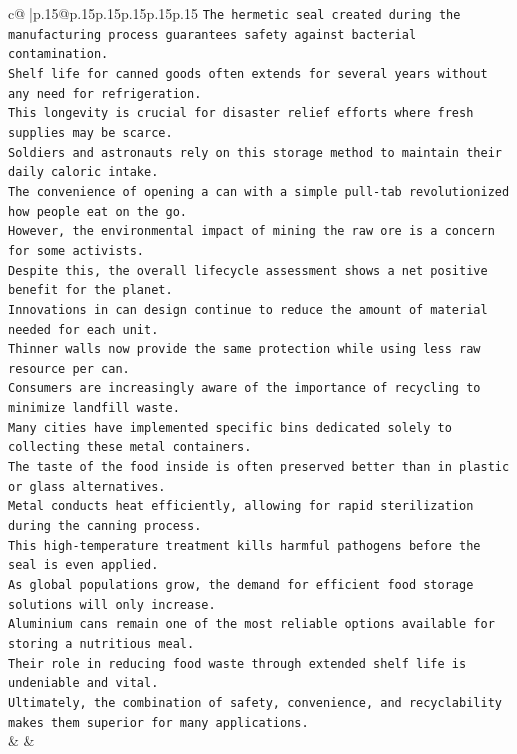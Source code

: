 \documentclass{article}
\begin{document}
{\begin{supertabular}{c@{$\;$}|p{.15\linewidth}@{}p{.15\linewidth}p{.15\linewidth}p{.15\linewidth}p{.15\linewidth}p{.15\linewidth}}
{{{\texttt{The hermetic seal created during the manufacturing process guarantees safety against bacterial contamination.} \\
\texttt{Shelf life for canned goods often extends for several years without any need for refrigeration.} \\
\texttt{This longevity is crucial for disaster relief efforts where fresh supplies may be scarce.} \\
\texttt{Soldiers and astronauts rely on this storage method to maintain their daily caloric intake.} \\
\texttt{The convenience of opening a can with a simple pull{-}tab revolutionized how people eat on the go.} \\
\texttt{However, the environmental impact of mining the raw ore is a concern for some activists.} \\
\texttt{Despite this, the overall lifecycle assessment shows a net positive benefit for the planet.} \\
\texttt{Innovations in can design continue to reduce the amount of material needed for each unit.} \\
\texttt{Thinner walls now provide the same protection while using less raw resource per can.} \\
\texttt{Consumers are increasingly aware of the importance of recycling to minimize landfill waste.} \\
\texttt{Many cities have implemented specific bins dedicated solely to collecting these metal containers.} \\
\texttt{The taste of the food inside is often preserved better than in plastic or glass alternatives.} \\
\texttt{Metal conducts heat efficiently, allowing for rapid sterilization during the canning process.} \\
\texttt{This high{-}temperature treatment kills harmful pathogens before the seal is even applied.} \\
\texttt{As global populations grow, the demand for efficient food storage solutions will only increase.} \\
\texttt{Aluminium cans remain one of the most reliable options available for storing a nutritious meal.} \\
\texttt{Their role in reducing food waste through extended shelf life is undeniable and vital.} \\
\texttt{Ultimately, the combination of safety, convenience, and recyclability makes them superior for many applications.} \\
            }
        }
    }
    & & \\ \\


\end{supertabular}}
\end{document}
